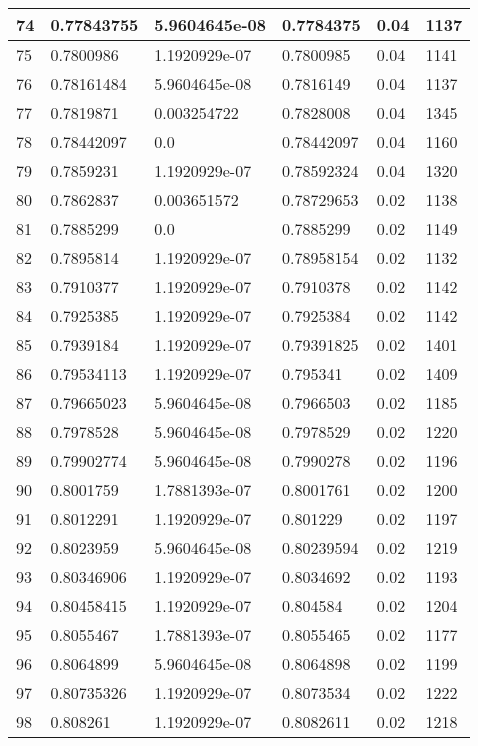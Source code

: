 \begin{longtable}{|l|l|l|l|l|l|}
74 & 0.77843755 & 5.9604645e-08 & 0.7784375 & 0.04 & 1137 \\ \hline 
75 & 0.7800986 & 1.1920929e-07 & 0.7800985 & 0.04 & 1141 \\ \hline 
76 & 0.78161484 & 5.9604645e-08 & 0.7816149 & 0.04 & 1137 \\ \hline 
77 & 0.7819871 & 0.003254722 & 0.7828008 & 0.04 & 1345 \\ \hline 
78 & 0.78442097 & 0.0 & 0.78442097 & 0.04 & 1160 \\ \hline 
79 & 0.7859231 & 1.1920929e-07 & 0.78592324 & 0.04 & 1320 \\ \hline 
80 & 0.7862837 & 0.003651572 & 0.78729653 & 0.02 & 1138 \\ \hline 
81 & 0.7885299 & 0.0 & 0.7885299 & 0.02 & 1149 \\ \hline 
82 & 0.7895814 & 1.1920929e-07 & 0.78958154 & 0.02 & 1132 \\ \hline 
83 & 0.7910377 & 1.1920929e-07 & 0.7910378 & 0.02 & 1142 \\ \hline 
84 & 0.7925385 & 1.1920929e-07 & 0.7925384 & 0.02 & 1142 \\ \hline 
85 & 0.7939184 & 1.1920929e-07 & 0.79391825 & 0.02 & 1401 \\ \hline 
86 & 0.79534113 & 1.1920929e-07 & 0.795341 & 0.02 & 1409 \\ \hline 
87 & 0.79665023 & 5.9604645e-08 & 0.7966503 & 0.02 & 1185 \\ \hline 
88 & 0.7978528 & 5.9604645e-08 & 0.7978529 & 0.02 & 1220 \\ \hline 
89 & 0.79902774 & 5.9604645e-08 & 0.7990278 & 0.02 & 1196 \\ \hline 
90 & 0.8001759 & 1.7881393e-07 & 0.8001761 & 0.02 & 1200 \\ \hline 
91 & 0.8012291 & 1.1920929e-07 & 0.801229 & 0.02 & 1197 \\ \hline 
92 & 0.8023959 & 5.9604645e-08 & 0.80239594 & 0.02 & 1219 \\ \hline 
93 & 0.80346906 & 1.1920929e-07 & 0.8034692 & 0.02 & 1193 \\ \hline 
94 & 0.80458415 & 1.1920929e-07 & 0.804584 & 0.02 & 1204 \\ \hline 
95 & 0.8055467 & 1.7881393e-07 & 0.8055465 & 0.02 & 1177 \\ \hline 
96 & 0.8064899 & 5.9604645e-08 & 0.8064898 & 0.02 & 1199 \\ \hline 
97 & 0.80735326 & 1.1920929e-07 & 0.8073534 & 0.02 & 1222 \\ \hline 
98 & 0.808261 & 1.1920929e-07 & 0.8082611 & 0.02 & 1218 \\ \hline 

\end{longtable}

